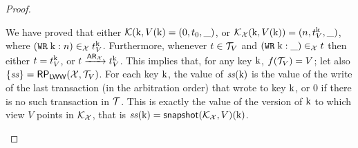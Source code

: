 \begin{proof}
\begin{itemize}
We have proved that either $\mathcal{K}(\mathrm{k}, V(\mathrm{k}) = (0, t_0, \_)$, or $\mathcal{K}_{\mathcal{X}}(\mathrm{k}, V(\mathrm{k})) = 
(n, t_{V}^{\mathrm{k}}, \_)$, where $({{\tt WR}}\;\mathrm{k}:n) \in_{\mathcal{X}} t_{V}^{\mathrm{k}}$.
Furthermore, whenever $t \in \mathcal{T}_{V}$ and $({{\tt WR}}\;\mathrm{k}: \_) \in_{\mathcal{X}} t$ 
then either $t = t_{V}^{\mathrm{k}}$, or $t \xrightarrow{{\sf{AR}}_{\mathcal{X}}} t_{V}^{\mathrm{k}}$. 
This implies that, for any key $\mathrm{k}$, $f(\mathcal{T}_{V}) = V$; let also $\{ \mathit{ss} \} = \mathsf{RP}_{\mathsf{LWW}}(\mathcal{X}, \mathcal{T}_{V})$. 
For each key $\mathrm{k}$, the value of $\mathit{ss}(\mathrm{k})$ is the value of the write of the last transaction 
(in the arbitration order) that wrote to key $\mathrm{k}$, or $0$ if there is no such transaction in $\mathcal{T}$. 
This is exactly the value of the version of $\mathrm{k}$ to which view $V$ points in $\mathcal{K}_{\mathcal{X}}$, 
that is $\mathit{ss}(\mathrm{k}) = \mathsf{snapshot}(\mathcal{K}_{\mathcal{X}}, V)(\mathrm{k})$.

\end{itemize}
\end{proof}

